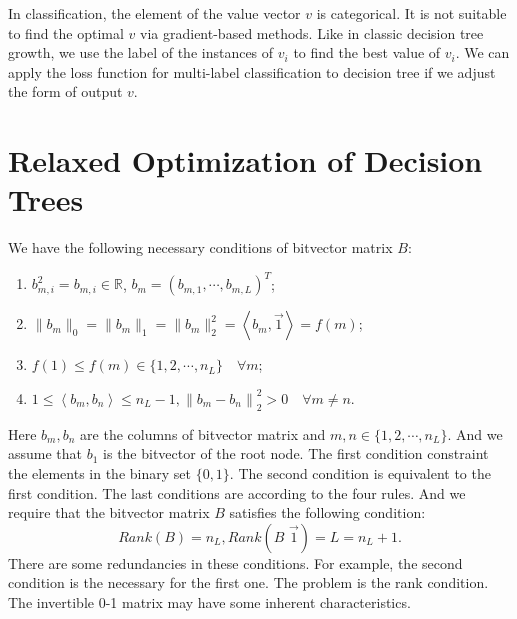 \documentclass[UTF8]{article}
\begin{document}
In classification, the element of the value vector $v$ is categorical.
It is not suitable to find the optimal $v$ via gradient-based methods.
Like in classic decision tree growth, we use the label of the instances of $v_i$
to find the best value of $v_i$.
We can apply the loss function for multi-label classification to decision tree
if we adjust the form of output $v$.

\section{Relaxed Optimization of Decision Trees}

We have the following necessary conditions of bitvector matrix $B$:
\begin{enumerate}
\item $b_{m,i}^2=b_{m,i}\in\mathbb{R}$, $b_m=(b_{m,1},\cdots, b_{m, L})^T$;
\item $\|b_m\|_0=\|b_m\|_1=\|b_m\|_2^2=\left<b_m, \vec{1}\right>=f(m)$;
\item $f(1)\leq f(m)\in\{1,2,\cdots,n_L\}\quad\forall m$;
\item $1\leq\left<b_m, b_n\right>\leq n_L -1, {\|b_m-b_n\|}_2^2> 0\quad\forall m\not=n$.
\end{enumerate}
Here $b_m, b_n$ are the columns of bitvector matrix
and $m,n\in\{1,2,\cdots,n_L\}$.
And we assume that $b_1$ is the bitvector of the root node.
The first condition constraint the elements in the binary set $\{0, 1\}$.
The second condition is equivalent to the first condition.
The last conditions are according to the four rules.
And we require that the bitvector matrix $B$ satisfies the following condition:
$$Rank(B)=n_L,  Rank(B\,\,\vec 1)=L=n_L+1.$$
There are some redundancies in these conditions.
For example, the second condition is the necessary for the first one.
The problem is the rank condition.
The invertible 0-1 matrix may have some inherent characteristics.
\end{document}
